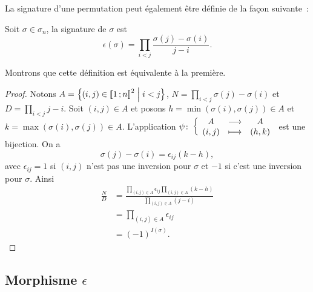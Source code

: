 La signature d'une permutation peut également être définie de la façon suivante~:
\begin{defdef}
  Soit $\sigma \in \sigma_n$, la signature de $\sigma$ est
  \begin{equation}
    \epsilon(\sigma)=\prod_{i<j} \frac{\sigma(j)-\sigma(i)}{j-i}.
  \end{equation}
\end{defdef}
Montrons que cette définition est équivalente à la première.
\begin{proof}
  Notons $A=\left\{(i,j) \in \mathopen{\llbracket}1\mathclose{}\mathpunct{};n\mathclose{\rrbracket}^2\mathrel{}\middle|\mathrel{}i<j\right\}$, $N=\prod_{i<j}\sigma(j)-\sigma(i)$ et $D=\prod_{i<j} j-i$. Soit $(i,j) \in A$ et posons $h=\min(\sigma(i),\sigma(j)) \in A$ et $k=\max(\sigma(i),\sigma(j))\in A$. L'application $\psi\colon \left\{\begin{array}{ccc} A & \longrightarrow &A\\ (i,j) & \longmapsto & (h,k) \end{array} \right.$ est une bijection. On a
  \begin{equation}
    \sigma(j)-\sigma(i) = \epsilon_{ij} (k-h),
  \end{equation}
  avec $\epsilon_{ij}=1$ si $(i,j)$ n'est pas une inversion pour $\sigma$ et $-1$ si c'est une inversion pour $\sigma$. Ainsi
  \begin{align}
    \frac{N}{D} &= \frac{\prod_{(i,j) \in A}\epsilon_{ij}\prod_{(i,j) \in A}(k-h)}{\prod_{(i,j) \in A}(j-i)}\\
    &=\prod_{(i,j) \in A}\epsilon_{ij}\\
    &=(-1)^{I(\sigma)}.  
  \end{align}
\end{proof}

\subsection{Morphisme $\epsilon$}

